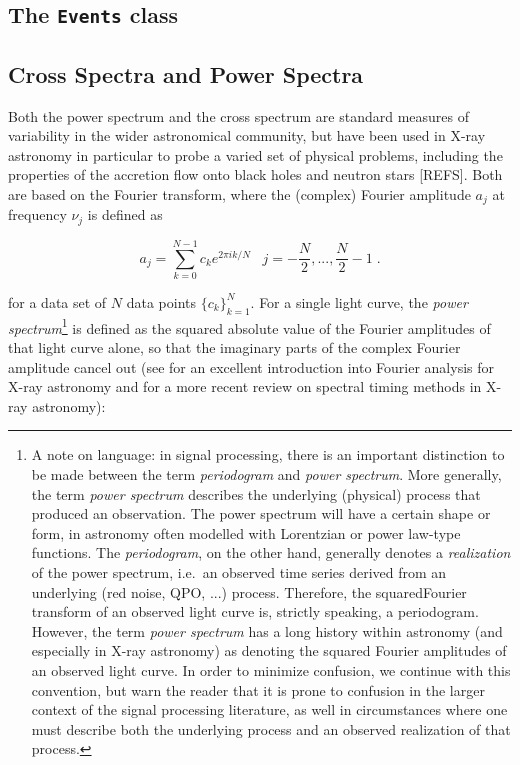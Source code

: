 \documentclass[12pt]{emulateapj}
\begin{document}
\subsection{The \texttt{Events} class}

\subsection{Cross Spectra and Power Spectra}
\label{sec:csps}

Both the power spectrum and the cross spectrum are standard measures of variability in the wider astronomical community, but have been used in X-ray astronomy in particular to probe a varied set of physical problems, including the properties of the accretion flow onto black holes and neutron stars [REFS]. Both are based on the Fourier transform, where the (complex) Fourier amplitude $a_j$ at frequency $\nu_j$ is defined as

\begin{equation}
a_j = \sum_{k=0}^{N-1}{c_k e^{2\pi i k/N}} \;\;\; j = -\frac{N}{2}, \mathrm{...}, \frac{N}{2} - 1 \; .
\end{equation}

\noindent for a data set of $N$ data points $\{c_k\}_{k=1}^N$. For a single light curve, the \textit{power spectrum}\footnote{A note on language: in signal processing, there is an important distinction to be made between the term \textit{periodogram} and \textit{power spectrum}. More generally, the term \textit{power spectrum} describes the underlying (physical) process that produced an observation. The power spectrum will have a certain shape or form, in astronomy often modelled with Lorentzian or power law-type functions. The \textit{periodogram}, on the other hand, generally denotes a \textit{realization} of the power spectrum, i.e.\ an observed time series derived from an underlying (red noise, QPO, ...) process. Therefore, the squaredFourier transform of an observed light curve is, strictly speaking, a periodogram. However, the term \textit{power spectrum} has a long history within astronomy (and especially in X-ray astronomy) as denoting the squared Fourier amplitudes of an observed light curve. In order to minimize confusion, we continue with this convention, but warn the reader that it is prone to confusion in the larger context of the signal processing literature, as well in circumstances where one must describe both the underlying process and an observed realization of that process.} is defined as the squared absolute value of the Fourier amplitudes of that light curve alone, so that the imaginary parts of the complex Fourier amplitude cancel out (see \citealt{vanderklis1989} for an excellent introduction into Fourier analysis for X-ray astronomy and \citealt{uttley2014} for a more recent review on spectral timing methods in X-ray astronomy):
\end{document}
